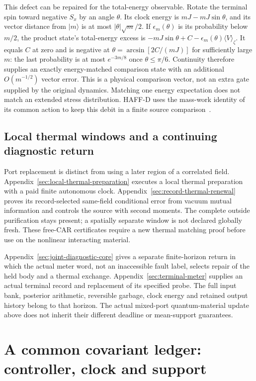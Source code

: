 This defect can be repaired for the total-energy observable. Rotate
the terminal spin toward negative $S_x$ by an angle $\theta$.
Its clock energy is $mJ-mJ\sin\theta$, and its vector distance from
$|m\rangle$ is at most $|\theta|\sqrt m/2$.
If $\epsilon_m(\theta)$ is its probability below $m/2$, the product
state's total-energy excess is
$-mJ\sin\theta+C-\epsilon_m(\theta)\langle V\rangle_\zeta$.
It equals $C$ at zero and is negative at
$\theta=\arcsin[2C/(mJ)]$ for sufficiently large $m$:
the last probability is at most $e^{-3m/8}$ once $\theta\le\pi/6$.
Continuity therefore supplies an exactly energy-matched comparison
state with an additional $O(m^{-1/2})$ vector error.
This is a physical comparison vector, not an extra gate supplied by
the original dynamics. Matching one energy expectation does not
match an extended stress distribution. HAFF-D uses the mass-work
identity of its common action to keep this debit in a finite source
comparison~\cite{Liu2026HAFFD}.


\subsection{Local thermal windows and a continuing diagnostic return}

Port replacement is distinct from using a later region of a correlated
field. Appendix~\ref{sec:local-thermal-preparation} executes a local
thermal preparation with a paid finite autonomous clock.
Appendix~\ref{sec:record-thermal-renewal} proves its record-selected
same-field conditional error from vacuum mutual information and controls
the source with second moments. The complete outside purification stays
present; a spatially separate window is not declared globally fresh.
These free-CAR certificates require a new thermal matching proof before
use on the nonlinear interacting material.

Appendix~\ref{sec:joint-diagnostic-core} gives a separate finite-horizon
return in which the actual meter word, not an inaccessible fault label,
selects repair of the held body and a thermal exchange.
Appendix~\ref{sec:terminal-meter} supplies an actual terminal record and
replacement of its specified probe. The full input bank, posterior
arithmetic, reversible garbage, clock energy and retained output history
belong to that horizon. The actual mixed-port quantum-material update
above does not inherit their different deadline or mean-support
guarantees.

\section{A common covariant ledger: controller, clock and support}
\label{sec:common-covariant-ledger}

